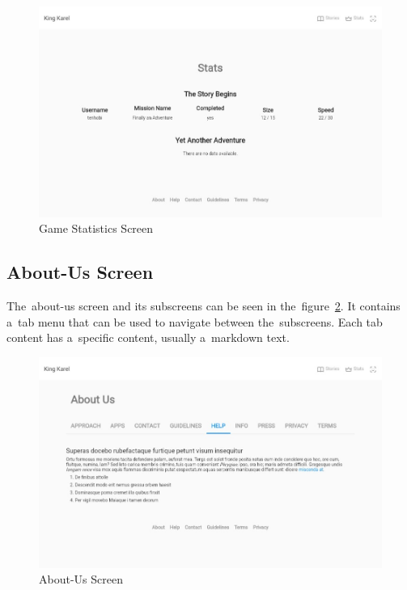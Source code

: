 \begin{figure}
    \centering
    \includegraphics[width=1\linewidth]{assets/implementation/ui/kingkarel_stats.jpeg}
    \caption{Game Statistics Screen}
    \label{fig:implementation:ui:stats}
\end{figure}

\subsection{About-Us Screen}

The~about-us screen and its subscreens can be seen in the~figure~\ref{fig:implementation:ui:aboutus}.
\linebreak
It contains a~tab menu that can be used to navigate between the~subscreens.
Each tab content has a~specific content, usually a~markdown text.

\begin{figure}
    \centering
    \includegraphics[width=1\linewidth]{assets/implementation/ui/kingkarel_aboutus.jpeg}
    \caption{About-Us Screen}
    \label{fig:implementation:ui:aboutus}
\end{figure}
